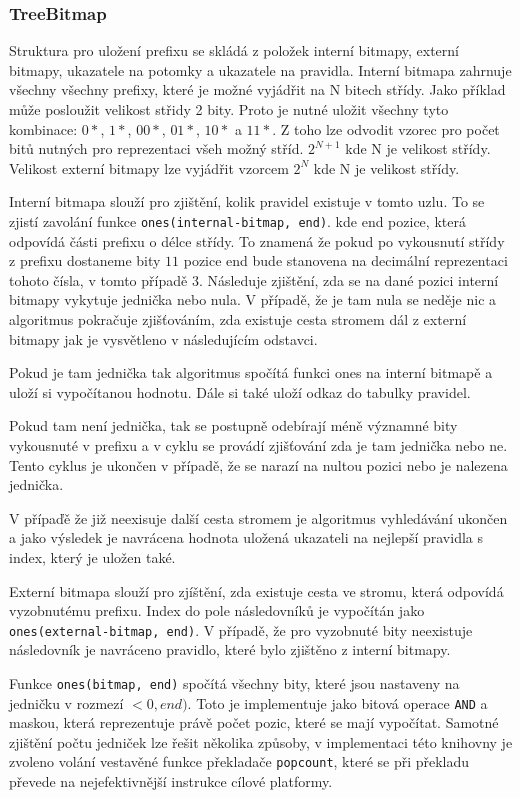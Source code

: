 \subsubsection{TreeBitmap}

Struktura pro uložení prefixu se skládá z položek interní bitmapy, externí bitmapy, ukazatele na potomky
a ukazatele na pravidla. Interní bitmapa zahrnuje všechny všechny prefixy,
které je možné vyjádřit na N bitech střídy. Jako příklad může posloužit velikost střidy 2 bity.
Proto je nutné uložit všechny tyto kombinace: $0*$, $1*$, $00*$, $01*$, $10*$ a $11*$.
Z toho lze odvodit vzorec pro počet bitů nutných pro reprezentaci všeh možný stříd.
$2^{N + 1}$ kde N je velikost střídy. Velikost externí bitmapy lze vyjádřit vzorcem $2^N$ kde N je velikost střídy.

Interní bitmapa slouží pro zjištění, kolik pravidel existuje v tomto uzlu.
To se zjistí zavolání funkce \texttt{ones(internal-bitmap, end)}. kde end pozice,
která odpovídá části prefixu o délce střídy.
To znamená že pokud po vykousnutí střídy z prefixu dostaneme bity
$11$ pozice end bude stanovena na decimální reprezentaci tohoto čísla, v tomto případě $3$.
Následuje zjištění, zda se na dané pozici interní bitmapy vykytuje jednička nebo nula.
V případě, že je tam nula se neděje nic a algoritmus pokračuje zjišťováním, zda existuje
cesta stromem dál z externí bitmapy jak je vysvětleno v následujícím odstavci.

Pokud je tam jednička tak algoritmus spočítá funkci ones na interní bitmapě a uloží si vypočítanou
hodnotu. Dále si také uloží odkaz do tabulky pravidel.

Pokud tam není jednička, tak se postupně odebírají méně významné bity vykousnuté v prefixu a v cyklu se provádí
zjišťování zda je tam jednička nebo ne. Tento cyklus je ukončen v případě, že se narazí na nultou pozici
nebo je nalezena jednička.

V přípaďě že již neexisuje další cesta stromem je algoritmus vyhledávání ukončen a jako výsledek
je navrácena hodnota uložená ukazateli na nejlepší pravidla s index, který je uložen také.

Externí bitmapa slouží pro zjíštění, zda existuje cesta ve stromu, která odpovídá vyzobnutému prefixu.
Index do pole následovníků je vypočítán jako \texttt{ones(external-bitmap, end)}. V případě,
že pro vyzobnuté bity neexistuje následovník je navráceno pravidlo, které bylo zjištěno z interní bitmapy.

Funkce \texttt{ones(bitmap, end)} spočítá všechny bity, které jsou nastaveny na jedničku v rozmezí $<0, end)$.
Toto je implementuje jako bitová operace \texttt{AND} a maskou, která reprezentuje právě počet pozic, které se
mají vypočítat. Samotné zjištění počtu jedniček lze řešit několika způsoby, v implementaci této knihovny
je zvoleno volání vestavěné funkce překladače \texttt{popcount}, které se při překladu převede na nejefektivnější
instrukce cílové platformy.

